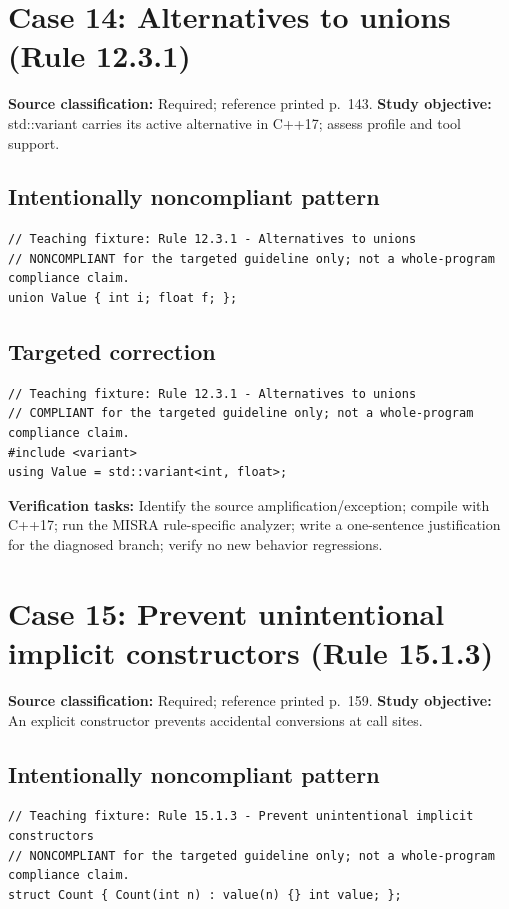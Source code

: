 \documentclass[10pt,letterpaper]{article}
\begin{document}
\section{Case 14: Alternatives to unions (Rule 12.3.1)}
\textbf{Source classification:} Required; reference printed p.~143. \textbf{Study objective:} std::variant carries its active alternative in C++17; assess profile and tool support.
\subsection*{Intentionally noncompliant pattern}
\begin{lstlisting}
// Teaching fixture: Rule 12.3.1 - Alternatives to unions
// NONCOMPLIANT for the targeted guideline only; not a whole-program compliance claim.
union Value { int i; float f; };
\end{lstlisting}
\subsection*{Targeted correction}
\begin{lstlisting}
// Teaching fixture: Rule 12.3.1 - Alternatives to unions
// COMPLIANT for the targeted guideline only; not a whole-program compliance claim.
#include <variant>
using Value = std::variant<int, float>;
\end{lstlisting}
\textbf{Verification tasks:} Identify the source amplification/exception; compile with C++17; run the MISRA rule-specific analyzer; write a one-sentence justification for the diagnosed branch; verify no new behavior regressions.

\section{Case 15: Prevent unintentional implicit constructors (Rule 15.1.3)}
\textbf{Source classification:} Required; reference printed p.~159. \textbf{Study objective:} An explicit constructor prevents accidental conversions at call sites.
\subsection*{Intentionally noncompliant pattern}
\begin{lstlisting}
// Teaching fixture: Rule 15.1.3 - Prevent unintentional implicit constructors
// NONCOMPLIANT for the targeted guideline only; not a whole-program compliance claim.
struct Count { Count(int n) : value(n) {} int value; };
\end{lstlisting}
\end{document}
